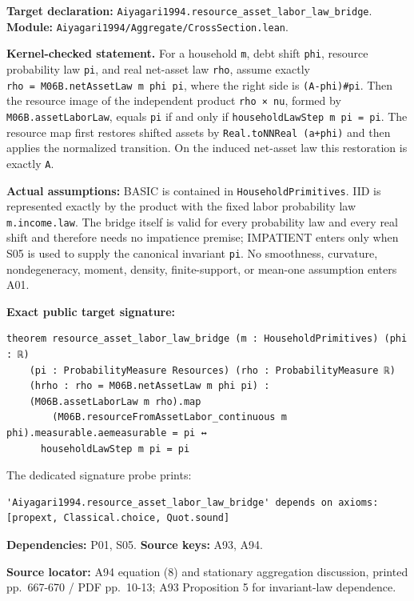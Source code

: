 \documentclass[
  11pt,
]{article}
\let\LedgerOriginalTexttt\texttt
\renewcommand{\texttt}[1]{{\small\LedgerOriginalTexttt{#1}}}
\begin{document}
\textbf{Target declaration:}
\texttt{Aiyagari1994.resource\_asset\_labor\_law\_bridge}.\\
\textbf{Module:} \texttt{Aiyagari1994/Aggregate/CrossSection.lean}.

\textbf{Kernel-checked statement.} For a household \texttt{m}, debt
shift \texttt{phi}, resource probability law \texttt{pi}, and real
net-asset law \texttt{rho}, assume exactly
\texttt{rho\ =\ M06B.netAssetLaw\ m\ phi\ pi}, where the right side is
\texttt{(A-phi)\#pi}. Then the resource image of the independent product
\texttt{rho\ ×\ nu}, formed by \texttt{M06B.assetLaborLaw}, equals
\texttt{pi} if and only if \texttt{householdLawStep\ m\ pi\ =\ pi}. The
resource map first restores shifted assets by
\texttt{Real.toNNReal\ (a+phi)} and then applies the normalized
transition. On the induced net-asset law this restoration is exactly
\texttt{A}.

\textbf{Actual assumptions:} BASIC is contained in
\texttt{HouseholdPrimitives}. IID is represented exactly by the product
with the fixed labor probability law \texttt{m.income.law}. The bridge
itself is valid for every probability law and every real shift and
therefore needs no impatience premise; IMPATIENT enters only when S05 is
used to supply the canonical invariant \texttt{pi}. No smoothness,
curvature, nondegeneracy, moment, density, finite-support, or mean-one
assumption enters A01.

\textbf{Exact public target signature:}

\begin{verbatim}
theorem resource_asset_labor_law_bridge (m : HouseholdPrimitives) (phi : ℝ)
    (pi : ProbabilityMeasure Resources) (rho : ProbabilityMeasure ℝ)
    (hrho : rho = M06B.netAssetLaw m phi pi) :
    (M06B.assetLaborLaw m rho).map
        (M06B.resourceFromAssetLabor_continuous m phi).measurable.aemeasurable = pi ↔
      householdLawStep m pi = pi
\end{verbatim}

The dedicated signature probe prints:

\begin{verbatim}
'Aiyagari1994.resource_asset_labor_law_bridge' depends on axioms:
[propext, Classical.choice, Quot.sound]
\end{verbatim}

\textbf{Dependencies:} P01, S05. \textbf{Source keys:} A93, A94.

\textbf{Source locator:} A94 equation (8) and stationary aggregation
discussion, printed pp.~667-670 / PDF pp.~10-13; A93 Proposition 5 for
invariant-law dependence.
\end{document}

